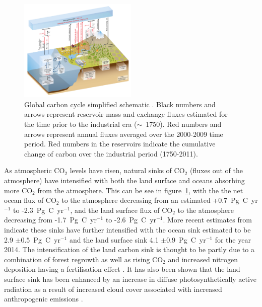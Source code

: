 \documentclass[12pt]{article}
\begin{document}
\begin{figure}[ht]
    \centering
    \includegraphics[width=0.5\textwidth]{ipcc_fig6_1.jpg}
    \caption{Global carbon cycle simplified schematic \citep{ciais2014carbon}. Black numbers and arrows represent reservoir mass and exchange fluxes estimated for the time prior to the industrial era (\(\sim\)~1750). Red numbers and arrows represent annual fluxes averaged over the 2000-2009 time period. Red numbers in the reservoirs indicate the cumulative change of carbon over the industrial period (1750-2011).}
    \label{fig:ipcc_fig6.1}
\end{figure}

As atmospheric CO\(_{2}\) levels have risen, natural sinks of CO\(_{2}\) (fluxes out of the atmosphere) have intensified with both the land surface and oceans absorbing more CO\(_{2}\) from the atmosphere. This can be see in figure~\ref{fig:ipcc_fig6.1}, with the the net ocean flux of CO\(_{2}\) to the atmosphere decreasing from an estimated +0.7~Pg~C~yr\(^{-1}\) to -2.3~Pg~C~yr\(^{-1}\), and the land surface flux of CO\(_{2}\) to the atmosphere decreasing from -1.7~Pg~C~yr\(^{-1}\) to -2.6~Pg~C~yr\(^{-1}\). More recent estimates from \citet{le2015global} indicate these sinks have further intensified with the ocean sink estimated to be 2.9 \(\pm 0.5\)~Pg~C~yr\(^{-1}\) and the land surface sink 4.1 \(\pm 0.9\)~Pg~C~yr\(^{-1}\) for the year 2014. The intensification of the land carbon sink is thought to be partly due to a combination of forest regrowth as well as rising CO\(_{2}\) and increased nitrogen deposition having a fertilisation effect \citep{ciais2014carbon}. It has also been shown that the land surface sink has been enhanced by an increase in diffuse photosynthetically active radiation as a result of increased cloud cover associated with increased anthropogenic emissions \citep{Mercadodiffuseradiation2009}. 
\end{document}
